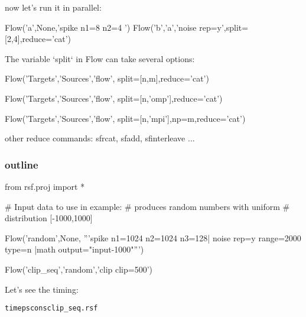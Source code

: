 \begin{frame}[fragile] 
now let's run it in parallel:
\begin{python}
Flow('a',None,'spike n1=8 n2=4 ')
Flow('b','a','noise rep=y',split=[2,4],reduce='cat')
\end{python}
\end{frame}



\begin{frame}
\end{frame}



\begin{frame}[fragile]
The variable `split` in Flow can take several options:
\begin{python} 
Flow('Targets','Sources','flow',
     split=[n,m],reduce='cat') 
\end{python}
\pause
\begin{python} 
Flow('Targets','Sources','flow',
     split=[n,'omp'],reduce='cat') 
\end{python}
\pause
\begin{python} 
Flow('Targets','Sources','flow',
     split=[n,'mpi'],np=m,reduce='cat') 
\end{python}

other reduce commands: sfrcat, sfadd, sfinterleave ...
\end{frame}




\begin{frame} \frametitle{outline}
\vfill 
{}
\vfill  
{}
\vfill 
{}
\vfill 
\end{frame}





\begin{frame}[fragile]
\begin{python}
from rsf.proj import * 

# Input data to use in example:
# produces random numbers with uniform 
# distribution [-1000,1000]

Flow('random',None,
    '''spike n1=1024 n2=1024 n3=128|
       noise rep=y range=2000  type=n
      |math output="input-1000"''')

Flow('clip_seq','random','clip clip=500')
\end{python}

Let's see the timing:

   \begin{alltt}
   time pscons clip_seq.rsf
   \end{alltt}
\end{frame}




